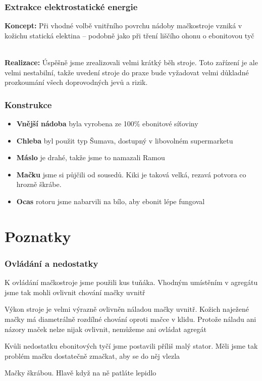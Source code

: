 \documentclass{beamer}
\newcommand{\mypause}{}
\begin{document}
\begin{frame}
\frametitle{Extrakce elektrostatické energie}
    \textbf{Koncept:}  Při vhodné volbě vnitřního povrchu nádoby mačkostroje vzniká v kožichu statická elektina -- podobně jako při tření liščího ohonu o ebonitovou tyč
    \mypause
    \\
    \vspace*{5pt}
    \textbf{Realizace:}  Úspěšně jsme zrealizovali velmi krátký běh stroje. Toto zařízení je ale velmi nestabilní, takže uvedení stroje do praxe bude vyžadovat velmi důkladné prozkoumání všech doprovodných jevů a rizik. 
\end{frame}

\begin{frame}
    \frametitle{Konstrukce}
    \begin{itemize}
        \item \textbf{Vnější nádoba}  byla vyrobena ze 100\% ebonitové síťoviny
        \mypause
        \item \textbf{Chleba}  byl použit typ Šumava, dostupný v libovolném supermarketu
        \mypause
        \item \textbf{Máslo}  je drahé, takže jsme to namazali Ramou
        \mypause
        \item \textbf{Mačku}  jsme si půjčili od sousedů. Kiki je taková velká, rezavá potvora co hrozně škrábe. 
        \mypause
        \item \textbf{Ocas}  rotoru jsme nabarvili na bílo, aby ebonit lépe fungoval
    \end{itemize}
\end{frame}

\section{Poznatky}
\begin{frame}
    \frametitle{Ovládání a nedostatky}
    K ovládání mačkostroje jsme použili kus tuňáka. Vhodným umístěním v agregátu jsme tak mohli ovlivnit chování mačky uvnitř
    \mypause \\ \vspace*{5pt}
    
    Výkon stroje je velmi výrazně ovlivněn náladou mačky uvnitř. Kožich naježené mačky má diametrálně rozdílné chování oproti mačce v klidu. Protože náladu ani názory maček nelze nijak ovlivnit, nemůžeme ani ovládat agregát
    \mypause \\ \vspace*{5pt}
    
    Kvůli nedostatku ebonitových tyčí jsme postavili příliš malý stator. Měli jsme tak problém mačku dostatečně zmačkat, aby se do něj vlezla
    \mypause \\ \vspace*{5pt}
    
    Mačky škrábou. Hlavě když na ně patláte lepidlo
\end{frame}
\end{document}

